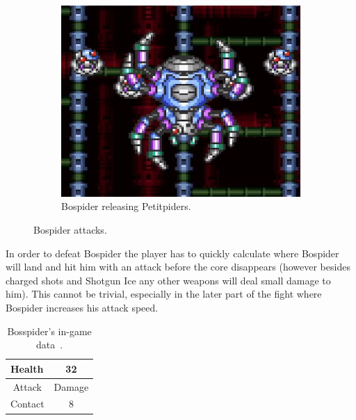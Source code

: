 \begin{figure}[htp]
\begin{subfigure}[t]{0.45\linewidth}
		\includegraphics[width=\linewidth]{figures/X1/Sigma_stages/Bospider_summon.jpg}
		\caption{Bospider releasing Petitpiders.}
	\end{subfigure}
	\caption{Bospider attacks.}
\end{figure} 
In order to defeat Bospider the player has to quickly calculate where Bospider will land and hit him with an attack before the core disappears (however besides charged shots and Shotgun Ice any other weapons will deal small damage to him). This cannot be trivial, especially in the later part of the fight where Bospider increases his attack speed.
\begin{table}
	\centering
	\begin{tabular}[h]{l c}
		\toprule
		Health  & 32\\
		\midrule
		\multicolumn{1}{c}{Attack} & \multicolumn{1}{c}{Damage}\\
		Contact & 8\\
		\bottomrule
	\end{tabular}
	\caption{Bosspider's in-game data~\cite{wiki:Bospider}. }
\end{table}


